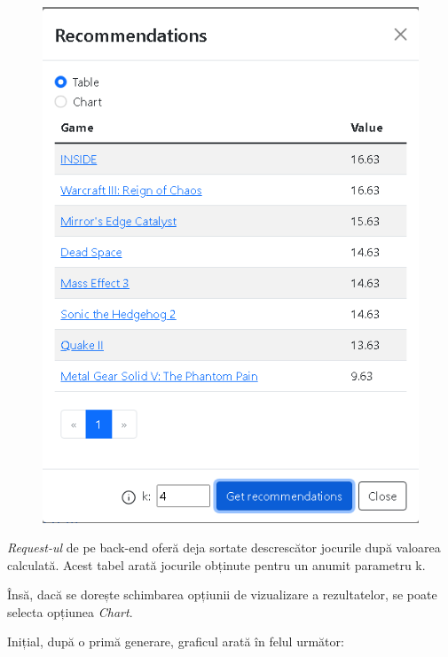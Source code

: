 \documentclass[12pt,a4paper]{report}
\begin{document}
\begin{figure}[H]
\centering
\caption{}
\begin{adjustbox}{max size={\textwidth}{\textheight}}
\includegraphics[scale=0.55]{exemplu_38_modal_2}
\end{adjustbox}

\end{figure}

\emph{Request-ul} de pe back-end oferă deja sortate descrescător jocurile după valoarea calculată. Acest tabel arată jocurile obținute pentru un anumit parametru k.

Însă, dacă se dorește schimbarea opțiunii de vizualizare a rezultatelor, se poate selecta opțiunea \emph{Chart}.

Inițial, după o primă generare, graficul arată în felul următor:
\end{document}
